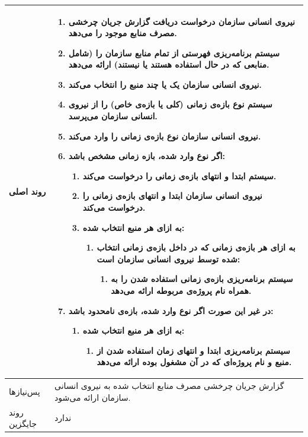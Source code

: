 \begin{table}[H]
\begin{tabular}{|p{3cm}|p{12cm}|}
		
		روند اصلی &
		\begin{enumerate}[topsep=0cm,leftmargin=0.5cm]
			\item نیروی انسانی سازمان درخواست دریافت گزارش جریان چرخشی مصرف منابع موجود را می‌دهد.
			\item سیستم برنامه‌ریزی فهرستی از تمام منابع سازمان را (شامل منابعی که در حال استفاده هستند یا نیستند) ارائه می‌دهد.
			\item نیروی انسانی سازمان یک یا چند منبع را انتخاب می‌کند.
			\item سیستم نوع بازه‌ی زمانی (کلی یا بازه‌ی خاص) را از نیروی انسانی سازمان می‌پرسد.
			\item نیروی انسانی سازمان نوع بازه‌ی زمانی را وارد می‌کند.
			\item اگر نوع وارد شده، بازه زمانی مشخص باشد:
			\begin{enumerate}
				\item سیستم ابتدا و انتهای بازه‌ی زمانی را درخواست می‌کند.
				\item نیروی انسانی سازمان ابتدا و انتهای بازه‌ی زمانی را درخواست می‌کند.
				\item به ازای هر منبع انتخاب شده:
				\begin{enumerate}[topsep=0cm,leftmargin=0.5cm]
					\item به ازای هر بازه‌ی زمانی که در داخل بازه‌ی زمانی انتخاب شده توسط نیروی انسانی سازمان است:
					\begin{enumerate}
						\item سیستم برنامه‌ریزی بازه‌ی زمانی استفاده شدن را به همراه نام پروژه‌ی مربوطه ارائه می‌دهد.
					\end{enumerate}
				\end{enumerate}		
			\end{enumerate}
			\item در غیر این صورت اگر نوع وارد شده، بازه‌ی نامحدود باشد:
			\begin{enumerate}
				\item به ازای هر منبع انتخاب شده:
				\begin{enumerate}[topsep=0cm,leftmargin=0.5cm]
					\item سیستم برنامه‌ریزی ابتدا و انتهای زمان استفاده شدن از منبع و نام پروژه‌ای که در آن مشغول بوده ارائه می‌دهد.
				\end{enumerate}		
			\end{enumerate}			
		\end{enumerate} \\
		\hline
		
		پس‌نیازها &
		گزارش جریان چرخشی مصرف منابع انتخاب شده به نیروی انسانی سازمان ارائه می‌شود. \\
		\hline
		
		روند جایگزین
		& ندارد \\
		\hline
		
	\end{tabular}
\end{table}


